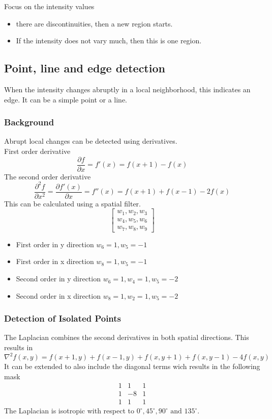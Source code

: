 Focus on the intensity values
\begin{itemize}
\item there are discontinuities, then a new region starts.
\item If the intensity does not vary much, then this is one region.
\end{itemize}

\subsection{Point, line and edge detection}

When the intensity changes abruptly in a local neighborhood, this indicates an edge. It can be a simple point or a line.

\subsubsection{Background}

Abrupt local changes can be detected using derivatives.\\
First order derivative
\[
	\frac{\partial f}{\partial x} = f'(x)=f(x+1)-f(x)
\]
The second order derivative
\[
	\frac{\partial^2f}{\partial x^2}=\frac{\partial f'(x)}{\partial x}=f''(x)=f(x+1)+f(x-1)-2f(x)
\]
This can be calculated using a spatial filter.
\[
	\begin{bmatrix}
	w_1, w_2, w_3\\
	w_4, w_5, w_6\\
	w_7, w_8, w_9
	\end{bmatrix}
\]
\begin{itemize}
\item First order in y direction $w_6=1, w_5=-1$
\item First order in x direction $w_8=1, w_5=-1$
\item Second order in y direction $w_6=1, w_4=1, w_5=-2$
\item Second order in x direction $w_8=1, w_2=1, w_5=-2$
\end{itemize}
\subsubsection{Detection of Isolated Points}
The Laplacian combines the second derivatives in both spatial directions. This results in
\[
	\nabla^2f(x,y)=f(x+1,y)+f(x-1,y)+f(x,y+1)+f(x,y-1)-4f(x,y)
\]
It can be extended to also include the diagonal terms wich results in the following mask
\[
	\begin{matrix}
	 1 & 1 & 1\\
	 1 & -8 & 1\\
	 1 & 1 & 1
	\end{matrix}
\]
The Laplacian is isotropic with respect to $0^\circ, 45^\circ, 90^\circ \text{ and } 135^\circ$. \\

